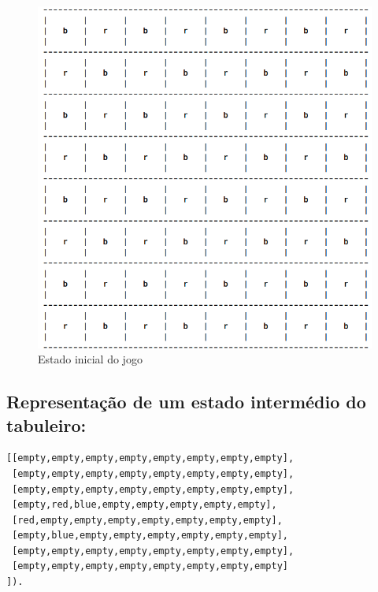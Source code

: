 \documentclass[a4paper,11pt,titlepage]{article}
\begin{document}
\begin{figure}[H]
    \center
    \includegraphics[scale=0.45]{res/7-initial-state.png}
    \caption{Estado inicial do jogo}
    \label{fig:7-initial-state.png}
\end{figure}

\subsection{Representação de um estado intermédio do tabuleiro:}
\begin{verbatim}
[[empty,empty,empty,empty,empty,empty,empty,empty],
 [empty,empty,empty,empty,empty,empty,empty,empty],
 [empty,empty,empty,empty,empty,empty,empty,empty],
 [empty,red,blue,empty,empty,empty,empty,empty],
 [red,empty,empty,empty,empty,empty,empty,empty],
 [empty,blue,empty,empty,empty,empty,empty,empty],
 [empty,empty,empty,empty,empty,empty,empty,empty],
 [empty,empty,empty,empty,empty,empty,empty,empty]
]).
\end{verbatim}
\end{document}
